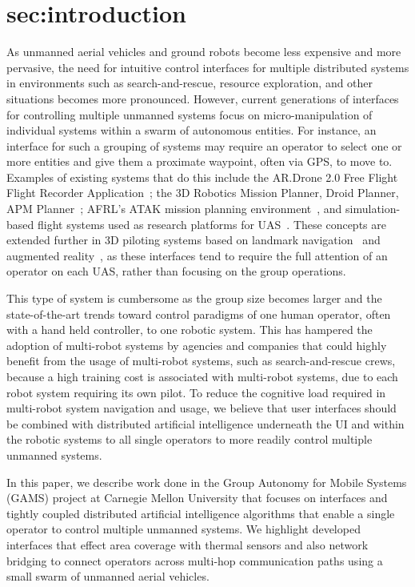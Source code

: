 \documentclass{sig-alternate-ipsn13}
\begin{document}
\section{sec:introduction}

As unmanned aerial vehicles and ground robots become less expensive and more
pervasive, the need for intuitive control interfaces for multiple distributed
systems in environments such as search-and-rescue, resource exploration, and
other situations becomes more pronounced. However, current generations of
interfaces for controlling multiple unmanned systems focus on micro-manipulation
of individual systems within a swarm of autonomous entities. For instance, an
interface for such a grouping of systems may require an operator to select one
or more entities and give them a proximate waypoint, often via GPS, to move to.
Examples of existing systems that do this include the AR.Drone 2.0 Free Flight
Flight Recorder Application~\cite{irizarry2012usability};
the 3D Robotics Mission Planner, Droid Planner,
APM Planner~\cite{arora2013development}; AFRL's ATAK mission
planning environment~\cite{gillen2012beyond}, and simulation-based flight
systems used as research platforms for UAS~\cite{puls2009gps,chao2007autopilots}.
These concepts are extended further in 3D piloting systems based on landmark
navigation~\cite{ranft20133d} and augmented reality~\cite{kochflying}, as
these interfaces tend to require the full attention
of an operator on each UAS, rather than focusing on the group operations.

This type of system is cumbersome as the group size becomes larger and the
state-of-the-art trends toward control paradigms of one human operator, often
with a hand held controller, to one robotic system. This has hampered the
adoption of multi-robot systems by agencies and companies that could highly
benefit from the usage of multi-robot systems, such as search-and-rescue crews,
because a high training cost is associated with multi-robot systems, due to each
robot system requiring its own pilot. To reduce the cognitive load required in
multi-robot system navigation and usage, we believe that user interfaces should
be combined with distributed artificial intelligence underneath the UI and
within the robotic systems to all single operators to more readily control
multiple unmanned systems.

In this paper, we describe work done in the Group Autonomy for Mobile Systems
(GAMS) project at Carnegie Mellon University that focuses on interfaces and
tightly coupled distributed artificial intelligence algorithms that enable a single
operator to control multiple unmanned systems. We highlight developed interfaces
that effect area coverage with thermal sensors and also network bridging to
connect operators across multi-hop communication paths using a small swarm of
unmanned aerial vehicles.
\end{document}
